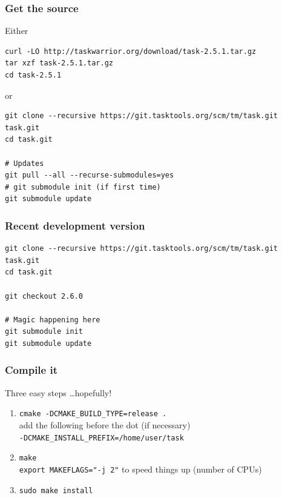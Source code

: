 \documentclass[t,handout]{beamer}
\begin{document}
\begin{frame}[fragile]\frametitle{Get the source}
    \vfill
    Either

    \begin{lstlisting}
curl -LO http://taskwarrior.org/download/task-2.5.1.tar.gz
tar xzf task-2.5.1.tar.gz
cd task-2.5.1\end{lstlisting} \pause

    or

    \begin{lstlisting}
git clone --recursive https://git.tasktools.org/scm/tm/task.git task.git
cd task.git

# Updates
git pull --all --recurse-submodules=yes
# git submodule init (if first time)
git submodule update\end{lstlisting}
\end{frame}

\begin{frame}[fragile]\frametitle{Recent development version}
    \vfill
    \begin{lstlisting}
git clone --recursive https://git.tasktools.org/scm/tm/task.git task.git
cd task.git

git checkout 2.6.0

# Magic happening here
git submodule init
git submodule update\end{lstlisting}
\end{frame}

\begin{frame}[fragile]\frametitle{Compile it}
    \vfill
    Three easy steps \ldots hopefully! \pause
    \begin{enumerate}
        \item \verb+cmake -DCMAKE_BUILD_TYPE=release .+ \\
              add the following before the dot (if necessary) \\
              \verb+-DCMAKE_INSTALL_PREFIX=/home/user/task+ \pause
        \item \verb=make= \\
            {\small \verb+export MAKEFLAGS="-j 2"+ to speed things up (number of CPUs)} \pause
        \item \verb=sudo make install=
    \end{enumerate}
\end{frame}
\end{document}
